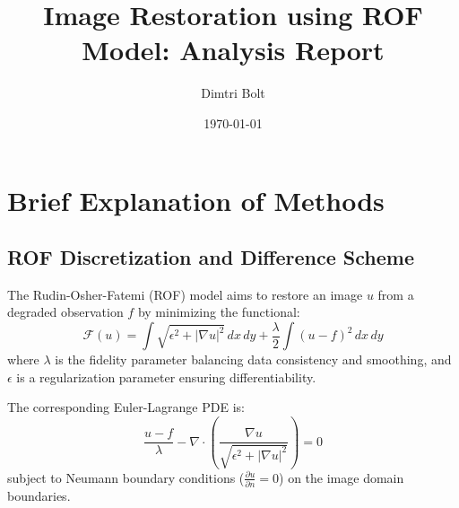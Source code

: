 \documentclass{article}
\title{Image Restoration using ROF Model: Analysis Report}
\author{Dimtri Bolt}
\date{\today} %
\begin{document}
	
	\maketitle
	
	\section{Brief Explanation of Methods}
	
	\subsection{ROF Discretization and Difference Scheme}
	The Rudin-Osher-Fatemi (ROF) model aims to restore an image $u$ from a degraded observation $f$ by minimizing the functional:
	$$ \mathcal{F}(u) = \int \sqrt{\epsilon^{2} + |\nabla u|^{2}} \,dx\,dy + \frac{\lambda}{2} \int (u-f)^{2} \,dx\,dy $$
	where $\lambda$ is the fidelity parameter balancing data consistency and smoothing, and $\epsilon$ is a regularization parameter ensuring differentiability.
	
	The corresponding Euler-Lagrange PDE is:
	$$ \frac{u-f}{\lambda} - \nabla \cdot \left( \frac{\nabla u}{\sqrt{\epsilon^{2} + |\nabla u|^2}} \right) = 0 $$
	subject to Neumann boundary conditions ($\frac{\partial u}{\partial n} = 0$) on the image domain boundaries.
	
\end{document}

